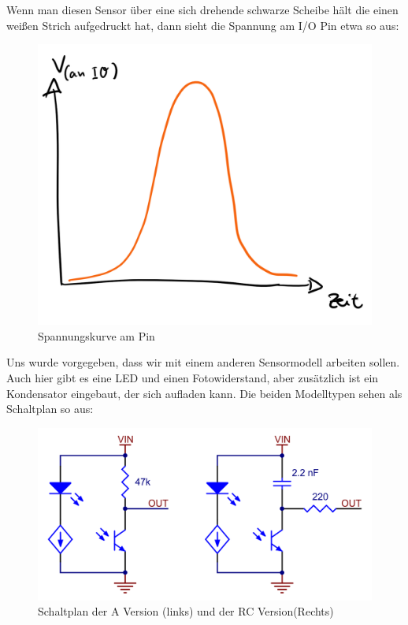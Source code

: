 	Wenn man diesen Sensor über eine sich drehende schwarze Scheibe hält die einen weißen Strich aufgedruckt hat, dann sieht die Spannung am I/O Pin etwa so aus:
	
	\begin{figure}[H]
		\centering
		\label{Spannungskurve}
	 \includegraphics[scale=0.3]{img/Sensor/Sensor5.png}
		\caption{Spannungskurve am Pin}
	\end{figure}
	\newpage
	
	Uns wurde vorgegeben, dass wir mit einem anderen Sensormodell arbeiten sollen. Auch hier gibt es eine LED und einen Fotowiderstand, aber zusätzlich ist ein Kondensator eingebaut, der sich aufladen kann. Die beiden Modelltypen sehen als Schaltplan so aus:
	
	\begin{figure}[H]
		\centering
		\label{schaltplanSensor}
		\includegraphics{img/Sensor/Schaltplan.png}
		\caption{Schaltplan der A Version (links) und der RC Version(Rechts) \cite{poluluQTRXHD15AReflectanceSensor2021}}
	\end{figure}
	


